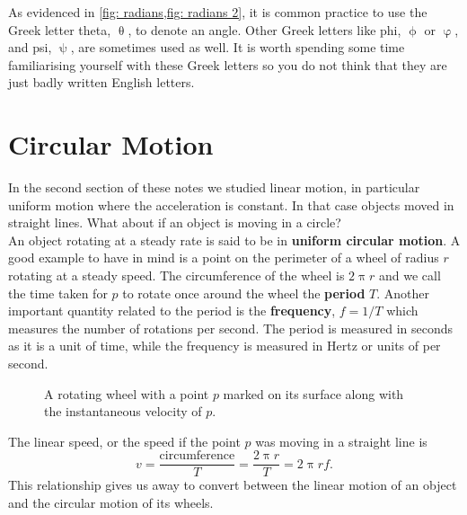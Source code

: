 \documentclass[a4paper,12pt]{book}
\begin{document}
As evidenced in \cref{fig: radians,fig: radians 2}, it is common practice to use the Greek letter theta, $\uptheta$, to denote an angle. Other Greek letters like phi, $\upphi$ or $\upvarphi$, and psi, $\uppsi$, are sometimes used as well. It is worth spending some time familiarising yourself with these Greek letters so you do not think that they are just badly written English letters.

\section{Circular Motion}
In the second section of these notes we studied linear motion, in particular uniform motion where the acceleration is constant. In that case objects moved in straight lines. What about if an object is moving in a circle?\\

An object rotating at a steady rate is said to be in \textbf{uniform circular motion}. A good example to have in mind is a point on the perimeter of a wheel of radius $r$ rotating at a steady speed. The circumference of the wheel is $2\uppi r$ and we call the time taken for $p$ to rotate once around the wheel the \textbf{period} $T$. Another important quantity related to the period is the \textbf{frequency}, $f=1/T$ which measures the number of rotations per second. The period is measured in seconds as it is a unit of time, while the frequency is measured in Hertz or units of per second.\\

\begin{figure}[ht]
    \centering
    \caption{A rotating wheel with a point $p$ marked on its surface along with the instantaneous velocity of $p$.}
        \label{fig: pt on a wheel}
\end{figure}

The linear speed, or the speed if the point $p$ was moving in a straight line is 
\begin{equation*}
v=\frac{\text{circumference}}{T}=\frac{2\uppi r}{T}=2\uppi r f.
\end{equation*}
This relationship gives us away to convert between the linear motion of an object and the circular motion of its wheels.
\end{document}
